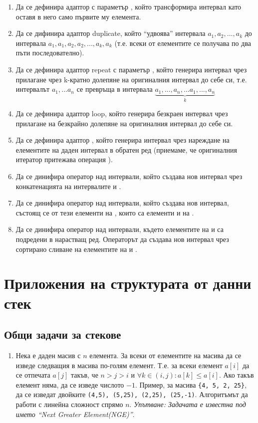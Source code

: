 \begin{enumerate}[resume]
  \item Да се дефинира адаптор  с параметър , който трансформира интервал като оставя в него само първите му  елемента.
  \item Да се дифинира адаптор duplicate, който ``удвоява'' интервала $a_1,a_2,...,a_k$ до интервала $a_1,a_1,a_2,a_2,...,a_k,a_k$ (т.е. всеки от елементите се получава по два пъти последователно).
  \item Да се дефинира адаптор repeat с параметър , който генерира интервал чрез прилагане чрез k-кратно долепяне на оригиналния интервал до себе си, т.е. интервалът $a_1,...a_n$ се превръща в интервала $\underbrace{a_1,...,a_n,...a_1,...,a_n}_{k}$
  \item Да се дефинира адаптор loop, който генерира безкраен интервал чрез прилагане на безкрайно долепяне на оригиналния интервал до себе си.
  \item Да се дефинира адаптор , който генерира интервал чрез нареждане на елементите на даден интервал в обратен ред (приемаме, че оригиналния итератор притежава операция \code{---}).
  \item Да се динифира оператор  над интервали, който създава нов интервал чрез конкатенацията на интервалите  и .
  \item Да се динифира оператор  над интервали, който създава нов интервал, състоящ се от тези елементи на , които са елементи и на .
  \item Да се динифира оператор  над интервали, където елементите на  и  са подредени в нарастващ ред. Операторът да създава нов интервал чрез сортирано сливане на елементите на  и .
  
\end{enumerate}

\pagebreak
\section {Приложения на структурата от данни стек}

\subsection {Общи задачи за стекове}

\begin{enumerate}
  \item Нека е даден масив с $n$ елемента. За всеки от елементите на масива да се изведе следващия в масива по-голям елемент. Т.е. за всеки елемент $a[i]$ да се отпечата $a[j]$ такъв, че $n>j>i$ и $\forall k \in (i,j):a[k] \leq a[i]$. Ако такъв елемент няма, да се изведе числото $-1$. Пример, за масива \verb#{4, 5, 2, 25}#, да се изведат двойките \verb#(4,5), (5,25), (2,25), (25,-1)#. Алгоритъмът да работи с линейна сложност спрямо $n$. \emph{Упътване: Задачата е известна под името ``Next Greater Element(NGE)''}.
\end{enumerate}

